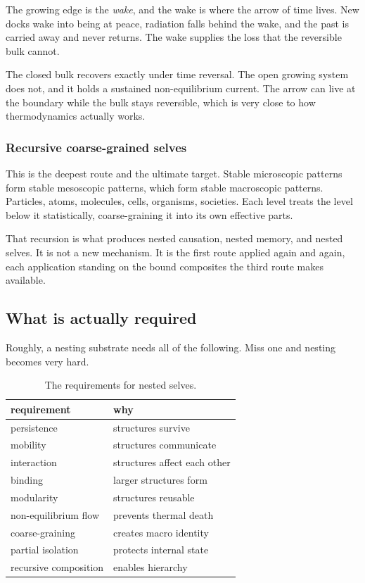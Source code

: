 The growing edge is the \emph{wake}, and the wake is where the arrow of time lives. New docks wake into being at peace, radiation falls behind the wake, and the past is carried away and never returns. The wake supplies the loss that the reversible bulk cannot.

\begin{result}
The closed bulk recovers exactly under time reversal. The open growing system does not, and it holds a sustained non-equilibrium current. The arrow can live at the boundary while the bulk stays reversible, which is very close to how thermodynamics actually works.
\end{result}

\subsubsection{Recursive coarse-grained selves}

This is the deepest route and the ultimate target. Stable microscopic patterns form stable mesoscopic patterns, which form stable macroscopic patterns. Particles, atoms, molecules, cells, organisms, societies. Each level treats the level below it statistically, coarse-graining it into its own effective parts.

That recursion is what produces nested causation, nested memory, and nested selves. It is not a new mechanism. It is the first route applied again and again, each application standing on the bound composites the third route makes available.

\subsection{What is actually required}

Roughly, a nesting substrate needs all of the following. Miss one and nesting becomes very hard.

\begin{table}[ht]
\centering
\begin{tabular}{@{}ll@{}}
\toprule
requirement & why \\
\midrule
persistence & structures survive \\
mobility & structures communicate \\
interaction & structures affect each other \\
binding & larger structures form \\
modularity & structures reusable \\
non-equilibrium flow & prevents thermal death \\
coarse-graining & creates macro identity \\
partial isolation & protects internal state \\
recursive composition & enables hierarchy \\
\bottomrule
\end{tabular}
\caption{The requirements for nested selves.}
\label{tab:nesting-requirements}
\end{table}

